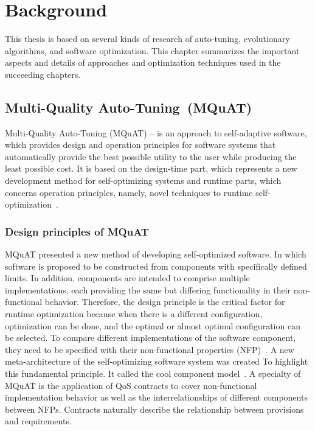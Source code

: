 \chapter{Background}
This thesis is based on several kinds of research of auto-tuning, evolutionary algorithms, and software optimization. This chapter summarizes the important aspects and details of approaches and optimization techniques used in the succeeding chapters.  

\section{Multi-Quality Auto-Tuning~(MQuAT)}

Multi-Quality Auto-Tuning (MQuAT) – is an approach to self-adaptive software, which provides design and operation principles for software systems that automatically provide the best possible utility to the user while producing the least possible cost.
It is based on the design-time part, which represents a new development method for self-optimizing systems and runtime parts, which concerns operation principles, namely,  novel techniques to runtime self-optimization~\cite{gotz13}.

\subsection{Design principles of MQuAT}

MQuAT presented a new method of developing self-optimized software. In which software is proposed to be constructed from components with specifically defined limits. In addition, components are intended to comprise multiple implementations, each providing the same but differing functionality in their non-functional behavior. Therefore, the design principle is the critical factor for runtime optimization because when there is a different configuration, optimization can be done, and the optimal or almost optimal configuration can be selected. To compare different implementations of the software component, they need to be specified with their non-functional properties (NFP)~\cite{gotz13}.
A new meta-architecture of the self-optimizing software system was created To highlight this fundamental principle. It called the cool component model~\cite{gotz10}.
A specialty of MQuAT is the application of QoS contracts to cover non-functional implementation behavior as well as the interrelationships of different components between NFPs. Contracts naturally describe the relationship between provisions and requirements.

